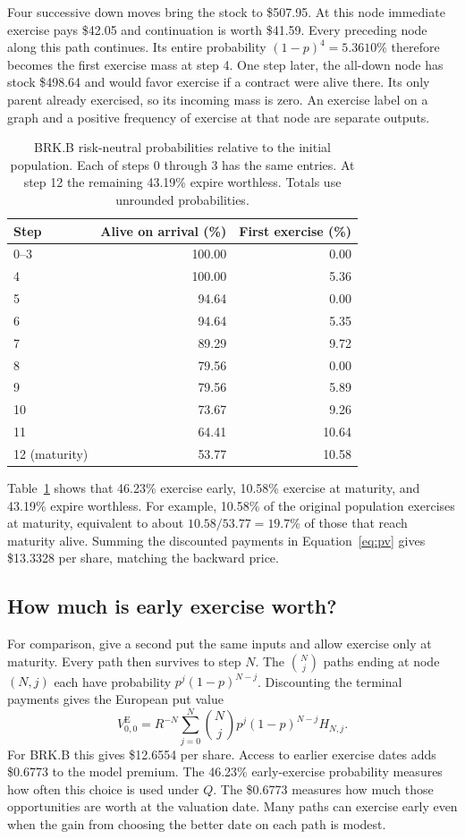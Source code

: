 \documentclass[11pt]{article}
\begin{document}
Four successive down moves bring the stock to \$507.95. At this node immediate exercise pays \$42.05 and continuation is worth \$41.59. Every preceding node along this path continues. Its entire probability $(1-p)^4=5.3610\%$ therefore becomes the first exercise mass at step 4. One step later, the all-down node has stock \$498.64 and would favor exercise if a contract were alive there. Its only parent already exercised, so its incoming mass is zero. An exercise label on a graph and a positive frequency of exercise at that node are separate outputs.

\begin{table}[ht]
\centering\small
\begin{tabular}{lrr}
\toprule
Step & Alive on arrival (\%) & First exercise (\%)\\
\midrule
0--3 & 100.00 & 0.00\\
4 & 100.00 & 5.36\\
5 & 94.64 & 0.00\\
6 & 94.64 & 5.35\\
7 & 89.29 & 9.72\\
8 & 79.56 & 0.00\\
9 & 79.56 & 5.89\\
10 & 73.67 & 9.26\\
11 & 64.41 & 10.64\\
12 (maturity) & 53.77 & 10.58\\
\bottomrule
\end{tabular}
\caption{BRK.B risk-neutral probabilities relative to the initial population. Each of steps 0 through 3 has the same entries. At step 12 the remaining 43.19\% expire worthless. Totals use unrounded probabilities.}
\label{tab:brkb}
\end{table}

Table~\ref{tab:brkb} shows that 46.23\% exercise early, 10.58\% exercise at maturity, and 43.19\% expire worthless. For example, 10.58\% of the original population exercises at maturity, equivalent to about $10.58/53.77=19.7\%$ of those that reach maturity alive. Summing the discounted payments in Equation~\eqref{eq:pv} gives \$13.3328 per share, matching the backward price.

\subsection{How much is early exercise worth?}
For comparison, give a second put the same inputs and allow exercise only at maturity. Every path then survives to step $N$. The $\binom{N}{j}$ paths ending at node $(N,j)$ each have probability $p^j(1-p)^{N-j}$. Discounting the terminal payments gives the European put value
\[
 V^{\mathrm{E}}_{0,0}=R^{-N}\sum_{j=0}^{N}
 \binom{N}{j}p^j(1-p)^{N-j}H_{N,j}.
\]
For BRK.B this gives \$12.6554 per share. Access to earlier exercise dates adds \$0.6773 to the model premium. The 46.23\% early-exercise probability measures how often this choice is used under $Q$. The \$0.6773 measures how much those opportunities are worth at the valuation date. Many paths can exercise early even when the gain from choosing the better date on each path is modest.
\end{document}

